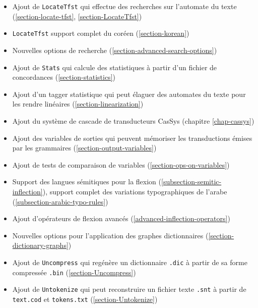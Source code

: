 \begin{itemize}
  \item Ajout de  \verb$LocateTfst$ qui effectue des recherches sur l'automate du texte
 (\ref{section-locate-tfst}, \ref{section-LocateTfst})
 
  \item \verb$LocateTfst$ support complet du coréen (\ref{section-korean})
  	  
  \item Nouvelles options de recherche (\ref{section-advanced-search-options})
  	  
  \item Ajout de \verb$Stats$ qui calcule des statistiques à partir d'un fichier de concordances
 (\ref{section-statistics})
 
  \item Ajout d'un tagger statistique qui peut élaguer des automates du texte pour les rendre
  	  linéaires (\ref{section-linearization})
  	  
  \item Ajout du système de cascade de transducteurs CasSys (chapitre \ref{chap-cassys})
  	  
  \item Ajout des variables de sorties qui peuvent mémoriser les transductions émises par les
  	  grammaires (\ref{section-output-variables})
  	  
  \item Ajout de tests de comparaison de variables (\ref{section-ops-on-variables})
  	  
  \item Support des langues sémitiques pour la flexion (\ref{subsection-semitic-inflection}),
  	  support complet des variations typographiques de l'arabe
  	  (\ref{subsection-arabic-typo-rules})
  	  
  \item Ajout d'opérateurs de flexion avancés (\ref{advanced-inflection-operators})

  \item Nouvelles options pour l'application des graphes dictionnaires
  	  (\ref{section-dictionary-graphs})
  	  
  \item Ajout de \verb$Uncompress$ qui regénère un dictionnaire \verb$.dic$ à partir de sa forme
  	  compressée \verb$.bin$ (\ref{section-Uncompress})

  \item Ajout de \verb$Untokenize$ qui peut reconstruire un fichier texte \verb$.snt$
	à partir de  \verb$text.cod$ et \verb$tokens.txt$ (\ref{section-Untokenize})


\end{itemize}
